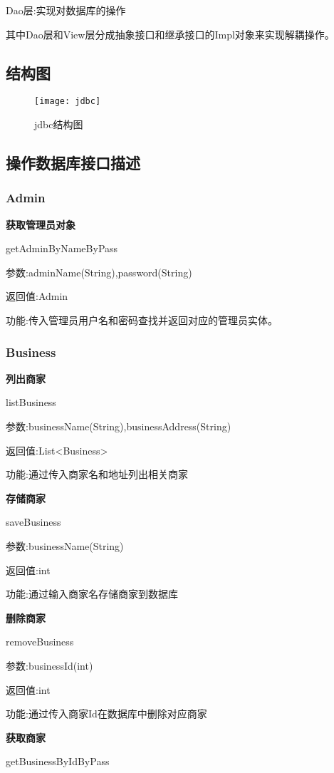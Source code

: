 Dao层:实现对数据库的操作

其中Dao层和View层分成抽象接口和继承接口的Impl对象来实现解耦操作。
\subsection{结构图}

\begin{figure}[htbp]
	\centering
	\texttt{[image: jdbc]}
	\caption{jdbc结构图}
	\vspace{\baselineskip}
\end{figure}
\subsection{操作数据库接口描述}
\subsubsection{Admin}
\textbf{获取管理员对象}

getAdminByNameByPass

参数:adminName(String),password(String)

返回值:Admin

功能:传入管理员用户名和密码查找并返回对应的管理员实体。

\subsubsection{Business}
\textbf{列出商家}

listBusiness

参数:businessName(String),businessAddress(String)

返回值:List<Business>

功能:通过传入商家名和地址列出相关商家

\textbf{存储商家}

saveBusiness

参数:businessName(String)

返回值:int

功能:通过输入商家名存储商家到数据库

\textbf{删除商家}

removeBusiness

参数:businessId(int)

返回值:int

功能:通过传入商家Id在数据库中删除对应商家

\textbf{获取商家}

getBusinessByIdByPass

